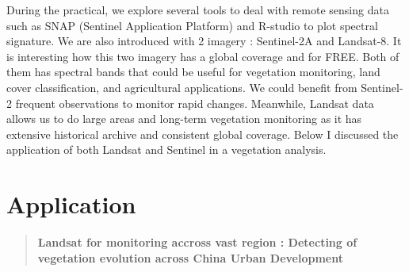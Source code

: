\documentclass[
  letterpaper,
  DIV=11,
  numbers=noendperiod]{scrreprt}
\begin{document}
During the practical, we explore several tools to deal with remote
sensing data such as SNAP (Sentinel Application Platform) and R-studio
to plot spectral signature. We are also introduced with 2 imagery :
Sentinel-2A and Landsat-8. It is interesting how this two imagery has a
global coverage and for FREE. Both of them has spectral bands that could
be useful for vegetation monitoring, land cover classification, and
agricultural applications. We could benefit from Sentinel-2 frequent
observations to monitor rapid changes. Meanwhile, Landsat data allows us
to do large areas and long-term vegetation monitoring as it has
extensive historical archive and consistent global coverage. Below I
discussed the application of both Landsat and Sentinel in a vegetation
analysis.

\hypertarget{application}{%
\section{\texorpdfstring{\textbf{Application}}{Application}}\label{application}}

\begin{quote}
\textbf{Landsat for monitoring accross vast region : Detecting of
vegetation evolution across China Urban Development}
\end{quote}
\end{document}
